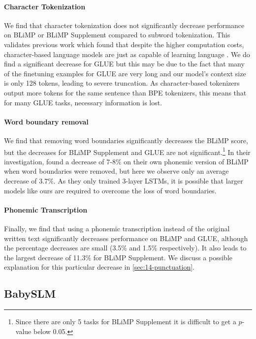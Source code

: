 \paragraph{Character Tokenization} We find that character tokenization does not significantly decrease performance on BLiMP or BLiMP Supplement compared to subword tokenization. This validates previous work which found that despite the higher computation costs, character-based language models are just as capable of learning language \citep{al-rfou_character-level_2019, hahn-baroni-2019-tabula}. We do find a significant decrease for GLUE but this may be due to the fact that many of the finetuning examples for GLUE are very long and our model's context size is only 128 tokens, leading to severe truncation. As character-based tokenizers output more tokens for the same sentence than BPE tokenizers, this means that for many GLUE tasks, necessary information is lost.

\paragraph{Word boundary removal} We find that removing word boundaries significantly decreases the BLiMP score, but the decreases for BLiMP Supplement and GLUE are not significant.\footnote{Since there are only 5 tasks for BLiMP Supplement it is difficult to get a $p$-value below 0.05.} In their investigation, \citet{nguyen-2022-word-boundaries} found a decrease of 7-8\% on their own phonemic version of BLiMP when word boundaries were removed, but here we observe only an average decrease of 3.7\%. As they only trained 3-layer LSTMs, it is possible that larger models like ours are required to overcome the loss of word boundaries.

\paragraph{Phonemic Transcription} Finally, we find that using a phonemic transcription instead of the original written text significantly decreases performance on BLiMP and GLUE, although the percentage decreases are small (3.5\% and 1.5\% respectively). It also leads to the largest decrease of 11.3\% for BLiMP Supplement. We discuss a possible explanation for this particular decrease in \cref{sec:14-punctuation}.

\subsection{BabySLM}
\label{sec:14-babyslm}

